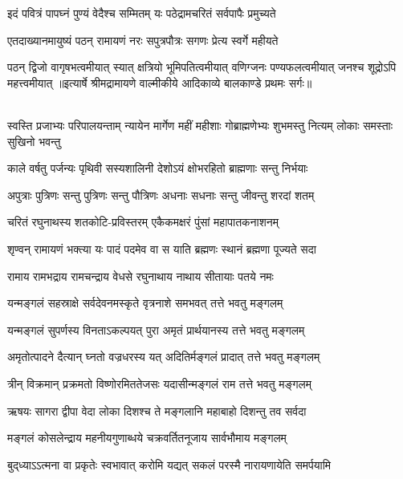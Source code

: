 \twolineshloka
{इदं पवित्रं पापघ्नं पुण्यं वेदैश्च सम्मितम्}
{यः पठेद्रामचरितं सर्वपापैः प्रमुच्यते}%

\twolineshloka
{एतदाख्यानमायुष्यं पठन् रामायणं नरः}
{सपुत्रपौत्रः सगणः प्रेत्य स्वर्गे महीयते}%

\fourlineindentedshloka
{पठन् द्विजो वागृषभत्वमीयात्}
{स्यात् क्षत्रियो भूमिपतित्वमीयात्}
{वणिग्जनः पण्यफलत्वमीयात्}
{जनश्च शूद्रोऽपि महत्त्वमीयात्}%
{॥इत्यार्षे श्रीमद्रामायणे वाल्मीकीये आदिकाव्ये बालकाण्डे प्रथमः सर्गः॥}

\mbox{}\\
\resetShloka
{}
\fourlineindentedshloka
{स्वस्ति प्रजाभ्यः परिपालयन्ताम्}
{न्यायेन मार्गेण महीं महीशाः}
{गोब्राह्मणेभ्यः शुभमस्तु नित्यम्}
{लोकाः समस्ताः सुखिनो भवन्तु}

\twolineshloka
{काले वर्षतु पर्जन्यः पृथिवी सस्यशालिनी}
{देशोऽयं क्षोभरहितो ब्राह्मणाः सन्तु निर्भयाः}

\twolineshloka
{अपुत्राः पुत्रिणः सन्तु पुत्रिणः सन्तु पौत्रिणः}
{अधनाः सधनाः सन्तु जीवन्तु शरदां शतम्}

\twolineshloka
{चरितं रघुनाथस्य शतकोटि-प्रविस्तरम्}
{एकैकमक्षरं पुंसां महापातकनाशनम्}

\twolineshloka
{शृण्वन् रामायणं भक्त्या यः पादं पदमेव वा}
{स याति ब्रह्मणः स्थानं ब्रह्मणा पूज्यते सदा}

\twolineshloka
{रामाय रामभद्राय रामचन्द्राय वेधसे}
{रघुनाथाय नाथाय सीतायाः पतये नमः}

\twolineshloka
{यन्मङ्गलं सहस्राक्षे सर्वदेवनमस्कृते}
{वृत्रनाशे समभवत् तत्ते भवतु मङ्गलम्}

\twolineshloka
{यन्मङ्गलं सुपर्णस्य विनताऽकल्पयत् पुरा}
{अमृतं प्रार्थयानस्य तत्ते भवतु मङ्गलम्}

\twolineshloka
{अमृतोत्पादने दैत्यान् घ्नतो वज्रधरस्य यत्}
{अदितिर्मङ्गलं प्रादात् तत्ते भवतु मङ्गलम्}

\twolineshloka
{त्रीन् विक्रमान् प्रक्रमतो विष्णोरमिततेजसः}
{यदासीन्मङ्गलं राम तत्ते भवतु मङ्गलम्}

\twolineshloka
{ऋषयः सागरा द्वीपा वेदा लोका दिशश्च ते}
{मङ्गलानि महाबाहो दिशन्तु तव सर्वदा}

\twolineshloka
{मङ्गलं कोसलेन्द्राय महनीयगुणाब्धये}
{चक्रवर्तितनूजाय सार्वभौमाय मङ्गलम्}

{बुद्‌ध्याऽऽत्मना वा प्रकृतेः स्वभावात्}
{करोमि यद्यत् सकलं परस्मै}
{नारायणायेति समर्पयामि}
